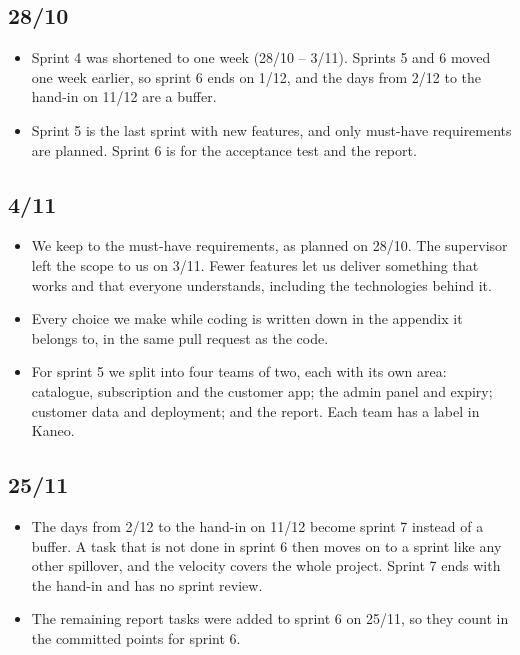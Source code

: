 \documentclass[a4paper,11pt]{article}
\begin{document}
\subsection*{28/10}
\begin{itemize}
    \item Sprint 4 was shortened to one week (28/10 -- 3/11). Sprints 5 and 6 moved one week earlier, so sprint 6 ends on 1/12, and the days from 2/12 to the hand-in on 11/12 are a buffer.
    \item Sprint 5 is the last sprint with new features, and only must-have requirements are planned. Sprint 6 is for the acceptance test and the report.
\end{itemize}

\subsection*{4/11}
\begin{itemize}
    \item We keep to the must-have requirements, as planned on 28/10. The supervisor left the scope to us on 3/11. Fewer features let us deliver something that works and that everyone understands, including the technologies behind it.
    \item Every choice we make while coding is written down in the appendix it belongs to, in the same pull request as the code.
    \item For sprint 5 we split into four teams of two, each with its own area: catalogue, subscription and the customer app; the admin panel and expiry; customer data and deployment; and the report. Each team has a label in Kaneo.
\end{itemize}

\subsection*{25/11}
\begin{itemize}
    \item The days from 2/12 to the hand-in on 11/12 become sprint 7 instead of a buffer. A task that is not done in sprint 6 then moves on to a sprint like any other spillover, and the velocity covers the whole project. Sprint 7 ends with the hand-in and has no sprint review.
    \item The remaining report tasks were added to sprint 6 on 25/11, so they count in the committed points for sprint 6.
\end{itemize}
\end{document}

